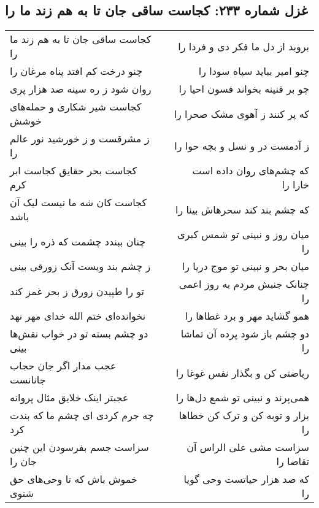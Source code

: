 \begin{center}
\section*{غزل شماره ۲۳۳: کجاست ساقی جان تا به هم زند ما را}
\label{sec:0233}
\begin{longtable}{l p{0.5cm} r}
کجاست ساقی جان تا به هم زند ما را
&&
بروبد از دل ما فکر دی و فردا را
\\
چنو درخت کم افتد پناه مرغان را
&&
چنو امیر بباید سپاه سودا را
\\
روان شود ز ره سینه صد هزار پری
&&
چو بر قنینه بخواند فسون احیا را
\\
کجاست شیر شکاری و حمله‌های خوشش
&&
که پر کنند ز آهوی مشک صحرا را
\\
ز مشرقست و ز خورشید نور عالم را
&&
ز آدمست در و نسل و بچه حوا را
\\
کجاست بحر حقایق کجاست ابر کرم
&&
که چشم‌های روان داده است خارا را
\\
کجاست کان شه ما نیست لیک آن باشد
&&
که چشم بند کند سحرهاش بینا را
\\
چنان ببندد چشمت که ذره را بینی
&&
میان روز و نبینی تو شمس کبری را
\\
ز چشم بند ویست آنک زورقی بینی
&&
میان بحر و نبینی تو موج دریا را
\\
تو را طپیدن زورق ز بحر غمز کند
&&
چنانک جنبش مردم به روز اعمی را
\\
نخوانده‌ای ختم الله خدای مهر نهد
&&
همو گشاید مهر و برد غطاها را
\\
دو چشم بسته تو در خواب نقش‌ها بینی
&&
دو چشم باز شود پرده آن تماشا را
\\
عجب مدار اگر جان حجاب جانانست
&&
ریاضتی کن و بگذار نفس غوغا را
\\
عجبتر اینک خلایق مثال پروانه
&&
همی‌پرند و نبینی تو شمع دل‌ها را
\\
چه جرم کردی ای چشم ما که بندت کرد
&&
بزار و توبه کن و ترک کن خطاها را
\\
سزاست جسم بفرسودن این چنین جان را
&&
سزاست مشی علی الراس آن تقاضا را
\\
خموش باش که تا وحی‌های حق شنوی
&&
که صد هزار حیاتست وحی گویا را
\\
\end{longtable}
\end{center}
